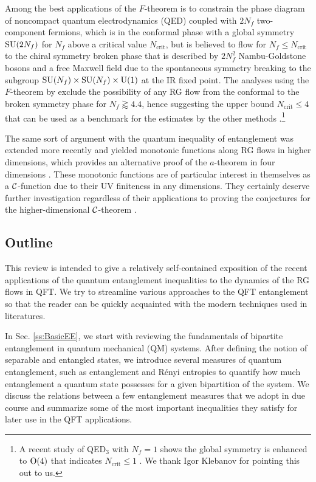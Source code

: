Among the best applications of the $F$-theorem is to constrain the phase diagram of noncompact quantum electrodynamics (QED) coupled with $2N_f$ two-component fermions, which is in the conformal phase with a global symmetry $\mathrm{SU} (2N_f)$ for $N_f$ above a critical value $N_\text{crit}$, but is believed to flow for $N_f\le N_\text{crit}$ to the chiral symmetry broken phase that is described by $2N_f^2$ Nambu-Goldstone bosons and a free Maxwell field due to the spontaneous symmetry breaking to the subgroup $\mathrm{SU} (N_f)\times \mathrm{SU} (N_f) \times \mathrm{U} (1)$ at the IR fixed point.
The analyses using the $F$-theorem by \textcite{Grover:2012sp,Giombi:2015haa} exclude the possibility of any RG flow from the conformal to the broken symmetry phase for $N_f \gtrapprox 4.4$, hence suggesting the upper bound $N_\text{crit} \le 4$ that can be used as a benchmark for the estimates by the other methods \cite{DiPietro:2015taa,Karthik:2015sgq,Gusynin:2016som,Karthik:2016ppr,Herbut:2016ide,DiPietro:2017kcd}.\footnote{A recent study of QED$_3$ with $N_f =1$ shows the global symmetry is enhanced to $\mathrm{O}(4)$ that indicates $N_\text{crit} \le 1$ \cite{Benini:2017dus}.
We thank Igor Klebanov for pointing this out to us.
}

The same sort of argument with the quantum inequality of entanglement was extended more recently \cite{Casini:2017vbe,Lashkari:2017rcl} and yielded monotonic functions along RG flows in higher dimensions, which provides an alternative proof of the $a$-theorem in four dimensions \cite{Casini:2017vbe}.
These monotonic functions are of particular interest in themselves as a ${\cal C}$-function due to their UV finiteness in any dimensions.
They certainly deserve further investigation regardless of their applications to proving the conjectures for the higher-dimensional ${\cal C}$-theorem \cite{Myers:2010xs,Myers:2010tj,Klebanov:2011gs,Giombi:2014xxa}.





\subsection{Outline}
This review is intended to give a relatively self-contained exposition of the recent applications of the quantum entanglement inequalities to the dynamics of the RG flows in QFT.
We try to streamline various approaches to the QFT entanglement so that the reader can be quickly acquainted with the modern techniques used in literatures.

In Sec. \ref{ss:BasicEE}, we start with reviewing the fundamentals of bipartite entanglement in quantum mechanical (QM) systems. 
After defining the notion of separable and entangled states, we introduce several measures of quantum entanglement, such as entanglement and R{\'e}nyi entropies to quantify how much entanglement a quantum state possesses for a given bipartition of the system.
We discuss the relations between a few entanglement measures that we adopt in due course and summarize some of the most important inequalities they satisfy for later use in the QFT applications.

